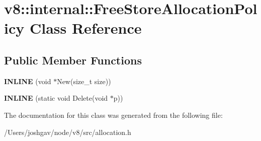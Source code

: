 \hypertarget{classv8_1_1internal_1_1_free_store_allocation_policy}{}\section{v8\+:\+:internal\+:\+:Free\+Store\+Allocation\+Policy Class Reference}
\label{classv8_1_1internal_1_1_free_store_allocation_policy}
\subsection*{Public Member Functions}
\begin{DoxyCompactItemize}
\item 
{\bfseries I\+N\+L\+I\+NE} (void $\ast$New(size\+\_\+t size))\hypertarget{classv8_1_1internal_1_1_free_store_allocation_policy_ac35066005db1902291d2bff8aa5b9bf7}{}\label{classv8_1_1internal_1_1_free_store_allocation_policy_ac35066005db1902291d2bff8aa5b9bf7}

\item 
{\bfseries I\+N\+L\+I\+NE} (static void Delete(void $\ast$p))\hypertarget{classv8_1_1internal_1_1_free_store_allocation_policy_afbd9ff2bc07d94ff427d37c51476054a}{}\label{classv8_1_1internal_1_1_free_store_allocation_policy_afbd9ff2bc07d94ff427d37c51476054a}

\end{DoxyCompactItemize}


The documentation for this class was generated from the following file\+:\begin{DoxyCompactItemize}
\item 
/\+Users/joshgav/node/v8/src/allocation.\+h\end{DoxyCompactItemize}
